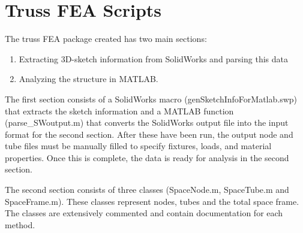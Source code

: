 \section{Truss FEA Scripts} \label{FEA Scripts}
	The truss FEA package created has two main sections:
	\begin{enumerate}
		\item Extracting 3D-sketch information from SolidWorks and parsing this data
		\item Analyzing the structure in MATLAB.
	\end{enumerate}

	The first section consists of a SolidWorks macro (genSketchInfoForMatlab.swp) that extracts the sketch information and a MATLAB function (parse\_SWoutput.m) that converts the SolidWorks output file into the input format for the second section. After these have been run, the output node and tube files must be manually filled to specify fixtures, loads, and material properties. Once this is complete, the data is ready for analysis in the second section.
	
	The second section consists of three classes (SpaceNode.m, SpaceTube.m and SpaceFrame.m). These classes represent nodes, tubes and the total space frame. The classes are extensively commented and contain documentation for each method.
